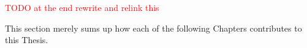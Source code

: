 \textcolor{red}{TODO at the end rewrite and relink this}

This section merely sums up how each of the following Chapters contributes to this Thesis.




